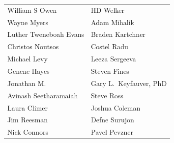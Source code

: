 \begin{center}
\begin{tabular}{l l}
William S Owen & HD Welker\\
Wayne Myers & Adam Mihalik\\
Luther Tweneboah Evans & Braden Kartchner\\
Christos Noutsos & Costel Radu\\
Michael Levy & Leeza Sergeeva\\
Genene Hayes & Steven Fines\\
Jonathan M. & Gary L.~Keyfauver, PhD\\
Avinash Seetharamaiah & Steve Ross\\
Laura Climer & Joshua Coleman\\
Jim Reesman & Defne Surujon\\
Nick Connors & Pavel Pevzner\\
\end{tabular}
\end{center}

\clearpage\null
\thispagestyle{empty}

